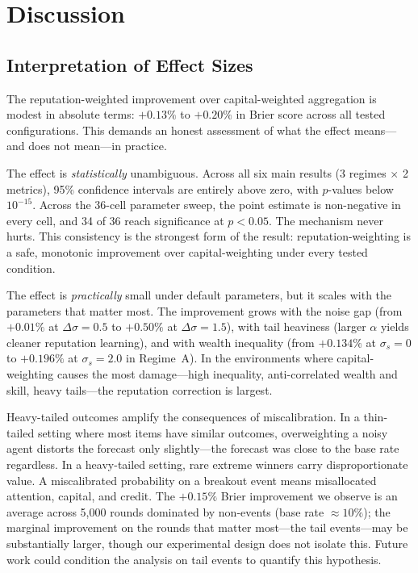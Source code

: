 \documentclass[conference]{IEEEtran}
\begin{document}
\section{Discussion}
\label{sec:discussion}

\subsection{Interpretation of Effect Sizes}
\label{sec:discussion-effect}

The reputation-weighted improvement over capital-weighted aggregation is modest in absolute terms: $+0.13\%$ to $+0.20\%$ in Brier score across all tested configurations. This demands an honest assessment of what the effect means---and does not mean---in practice.

The effect is \emph{statistically} unambiguous. Across all six main results (3 regimes $\times$ 2 metrics), 95\% confidence intervals are entirely above zero, with $p$-values below $10^{-15}$. Across the 36-cell parameter sweep, the point estimate is non-negative in every cell, and 34 of 36 reach significance at $p < 0.05$. The mechanism never hurts. This consistency is the strongest form of the result: reputation-weighting is a safe, monotonic improvement over capital-weighting under every tested condition.

The effect is \emph{practically} small under default parameters, but it scales with the parameters that matter most. The improvement grows with the noise gap (from $+0.01\%$ at $\Delta\sigma = 0.5$ to $+0.50\%$ at $\Delta\sigma = 1.5$), with tail heaviness (larger $\alpha$ yields cleaner reputation learning), and with wealth inequality (from $+0.134\%$ at $\sigma_s = 0$ to $+0.196\%$ at $\sigma_s = 2.0$ in Regime~A). In the environments where capital-weighting causes the most damage---high inequality, anti-correlated wealth and skill, heavy tails---the reputation correction is largest.

Heavy-tailed outcomes amplify the consequences of miscalibration. In a thin-tailed setting where most items have similar outcomes, overweighting a noisy agent distorts the forecast only slightly---the forecast was close to the base rate regardless. In a heavy-tailed setting, rare extreme winners carry disproportionate value. A miscalibrated probability on a breakout event means misallocated attention, capital, and credit. The $+0.15\%$ Brier improvement we observe is an average across 5,000 rounds dominated by non-events (base rate $\approx 10\%$); the marginal improvement on the rounds that matter most---the tail events---may be substantially larger, though our experimental design does not isolate this. Future work could condition the analysis on tail events to quantify this hypothesis.
\end{document}

